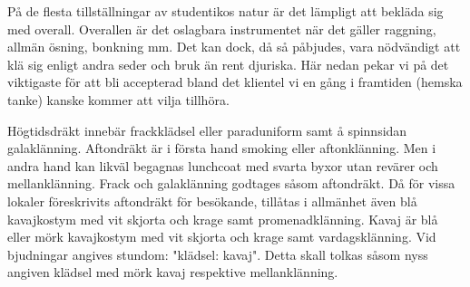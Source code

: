 
\pagestyle{Att Bonka med Shtil}


    På de flesta tillställningar av studentikos natur är det lämpligt att bekläda sig med overall. Overallen är det oslagbara instrumentet när det gäller raggning, allmän ösning, bonkning  mm. Det kan dock, då så påbjudes, vara nödvändigt att klä sig enligt andra seder och bruk än rent djuriska. Här nedan pekar vi på det viktigaste för att bli accepterad bland det klientel vi en gång i framtiden (hemska tanke) kanske kommer att vilja tillhöra.

    Högtidsdräkt innebär frackklädsel eller paraduniform samt å spinnsidan galaklänning. Aftondräkt är i första hand smoking eller aftonklänning. Men i andra hand kan likväl begagnas lunchcoat med svarta byxor utan revärer och mellanklänning. Frack och galaklänning godtages såsom aftondräkt. Då för vissa lokaler föreskrivits aftondräkt för besökande, tillåtas i allmänhet även blå kavajkostym med vit skjorta och krage samt promenadklänning. Kavaj är blå eller mörk kavajkostym med vit skjorta och krage samt vardagsklänning. Vid bjudningar angives stundom: "klädsel: kavaj". Detta skall tolkas såsom nyss angiven klädsel med mörk kavaj respektive mellanklänning.


